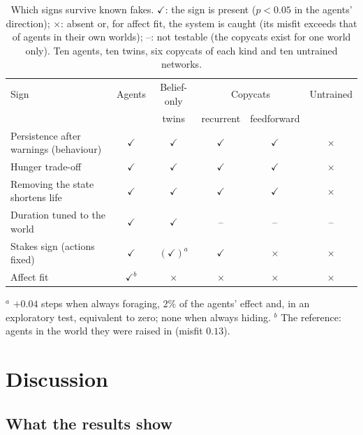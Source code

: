 \documentclass[11pt]{article}
\begin{document}
\begin{table}[t]
\centering\small
\caption{Which signs survive known fakes. $\checkmark$: the sign is present ($p<0.05$ in the agents' direction); $\times$: absent or, for affect fit, the system is caught (its misfit exceeds that of agents in their own worlds); --: not testable (the copycats exist for one world only). Ten agents, ten twins, six copycats of each kind and ten untrained networks.}
\label{tab:scorecard}
\begin{tabular}{@{}lccccc@{}}
\toprule
Sign & Agents & Belief-only & \multicolumn{2}{c}{Copycats} & Untrained \\
 & & twins & recurrent & feedforward & \\
\midrule
Persistence after warnings (behaviour) & $\checkmark$ & $\checkmark$ & $\checkmark$ & $\checkmark$ & $\times$ \\
Hunger trade-off & $\checkmark$ & $\checkmark$ & $\checkmark$ & $\checkmark$ & $\times$ \\
Removing the state shortens life & $\checkmark$ & $\checkmark$ & $\checkmark$ & $\checkmark$ & $\times$ \\
Duration tuned to the world & $\checkmark$ & $\checkmark$ & -- & -- & -- \\
Stakes sign (actions fixed) & $\checkmark$ & $(\checkmark)^{a}$ & $\checkmark$ & $\times$ & $\times$ \\
Affect fit & $\checkmark^{b}$ & $\times$ & $\times$ & $\times$ & $\times$ \\
\bottomrule
\end{tabular}

\smallskip
{\footnotesize $^{a}$ $+0.04$ steps when always foraging, $2\%$ of the agents' effect and, in an exploratory test, equivalent to zero; none when always hiding. $^{b}$ The reference: agents in the world they were raised in (misfit $0.13$).}
\end{table}

\section{Discussion}
\label{sec:discussion}

\subsection{What the results show}
\end{document}
